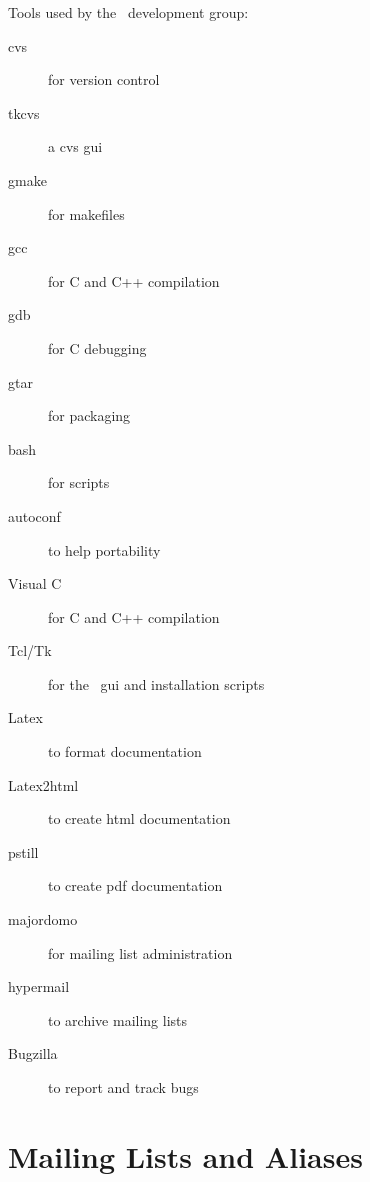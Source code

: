 Tools used by the \eclipse\ development group:
\begin{description}
\item[cvs] for version control
\item[tkcvs] a cvs gui
\item[gmake] for makefiles
\item[gcc] for C and C++ compilation
\item[gdb] for C debugging
\item[gtar] for packaging
\item[bash] for scripts
\item[autoconf] to help portability
\item[Visual C] for C and C++ compilation
\item[Tcl/Tk] for the \eclipse\ gui and installation scripts
\item[Latex] to format documentation
\item[Latex2html] to create html documentation
\item[pstill] to create pdf documentation
\item[majordomo] for mailing list administration
\item[hypermail] to archive mailing lists
\item[Bugzilla] to report and track bugs
\end{description}

\section{Mailing Lists and Aliases}

